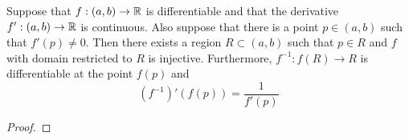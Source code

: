 \documentclass[../main.tex]{subfiles}
\begin{document}
\begin{theorem}\label{trm:12.21}
    Suppose that $f:(a,b)\to\mathbb{R}$ is differentiable and that the derivative $f':(a,b)\to\mathbb{R}$ is continuous. Also suppose that there is a point $p\in(a,b)$ such that $f'(p)\neq 0$. Then there exists a region $R\subset(a,b)$ such that $p\in R$ and $f$ with domain restricted to $R$ is injective. Furthermore, $f^{-1}:f(R)\to R$ is differentiable at the point $f(p)$ and
    \begin{equation*}
        (f^{-1})'(f(p)) = \frac{1}{f'(p)}
    \end{equation*}
    \begin{proof}

\end{proof}
\end{theorem}
\end{document}
